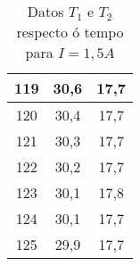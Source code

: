 \documentclass[12pt, a4paper, titlepage]{article}
\begin{document}
\begin{table}[H]
\begin{minipage}[c]{0,24\textwidth}
\begin{table}[H]
{\begin{tabular}{|c|c|c|}
        119 & 30,6 & 17,7 \\ \hline
        120 & 30,4 & 17,7 \\ \hline
        121 & 30,3 & 17,7 \\ \hline
        122 & 30,2 & 17,7 \\ \hline
        123 & 30,1 & 17,8 \\ \hline
        124 & 30,1 & 17,7 \\ \hline
        125 & 29,9 & 17,7 \\ \hline
        \end{tabular}}
        \end{table}
    \end{minipage}
    \begin{minipage}[c]{0,24\textwidth}
      \begin{table}[H]
        \end{table}
    \end{minipage}
    \caption{Datos $T_1$ e $T_2$ respecto ó tempo para $I = 1,5A$}
    \label{cad:t_i_15}
  \end{table}
\end{document}
